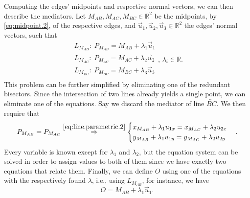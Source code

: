 \begin{comment}
This comes as a direct result from applying a rotation transformation of 90
degrees, or $\pi/2$ radians, to $\vec{u}$, like so
%
\[
  \vec{n} = R(\pi/2)\vec{u}%
  = \begin{bmatrix}
      \cos(\pi/2) & -\sin(\pi/2) \\
      \sin(\pi/2) & \cos(\pi/2)
    \end{bmatrix}
    \begin{bmatrix}
      u_1 \\ u_2
    \end{bmatrix}
  = \begin{bmatrix}
      0 & -1 \\
      1 & 0
    \end{bmatrix}
    \begin{bmatrix}
      u_1 \\ u_2
    \end{bmatrix}
  = \begin{bmatrix}
      -u_2 \\ u_1
    \end{bmatrix}.
\]
%
Let $\vec{u},\,\vec{n} \in \mathbb{R}^2$, such that $\vec{u} = (u_x,
u_y),\,\vec{n} = (-u_y, u_x)$.  From~\eqref{eq:vector.dot.2}, we have
\[ \vec{u} \cdot \vec{n} = u_x u_y - u_y u_x = 0.  \]
\end{comment}

Computing the edges' midpoints and respective normal vectors, we can then
describe the mediators.  Let $M_{AB}, M_{AC}, M_{BC} \in \mathbb{R}^2$ be the
midpoints, by \cref{eq:midpoint.2}, of the respective edges, and
$\vec{u}_1, \vec{u}_2, \vec{u}_3 \in \mathbb{R}^2$ the edges' normal vectors,
such that
\[
  \begin{split}
    L_{M_{AB}}\!:\; P_{M_{AB}} = M_{AB} + \lambda_1 \vec{u}_1 \\
    L_{M_{AC}}\!:\; P_{M_{AC}} = M_{AC} + \lambda_2 \vec{u}_2 \\
    L_{M_{BC}}\!:\; P_{M_{BC}} = M_{BC} + \lambda_3 \vec{u}_3 \\
  \end{split},\,\lambda_i \in \mathbb{R}.
\]
This problem can be further simplified by eliminating one of the redundant
bisectors.  Since the intersection of two lines already yields a single point,
we can eliminate one of the equations.  Say we discard the mediator of line
$\overleftrightarrow{BC}$.  We then require that
\[
  P_{M_{AB}} = P_{M_{AC}} \stackrel{\eqref{eq:line.parametric.2}}{\Rightarrow}
  \begin{cases}
    x_{M_{AB}} + \lambda_1 u_{1x} = x_{M_{AC}} + \lambda_2 u_{2x} \\
    y_{M_{AB}} + \lambda_1 u_{1y} = y_{M_{AC}} + \lambda_2 u_{2y} \\
  \end{cases}.
\]
Every variable is known except for $\lambda_1$ and $\lambda_2$, but the equation
system can be solved in order to assign values to both of them since we have
exactly two equations that relate them.  Finally, we can define $O$ using one of
the equations with the respectively found $\lambda$, i.e., using $L_{M_{AB}}$,
for instance, we have \[ O = M_{AB} + \lambda_1 \vec{u}_1. \]

